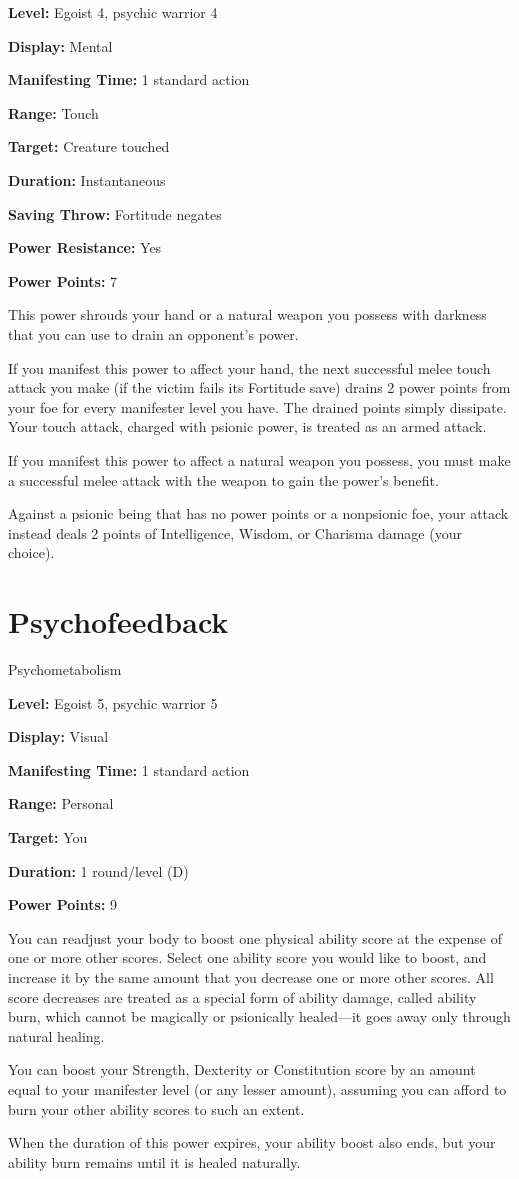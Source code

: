 \documentclass{article}
\begin{document}
\textbf{Level:} Egoist 4, psychic warrior 4

\textbf{Display:} Mental

\textbf{Manifesting Time:} 1 standard action

\textbf{Range:} Touch

\textbf{Target:} Creature touched

\textbf{Duration:} Instantaneous

\textbf{Saving Throw:} Fortitude negates

\textbf{Power Resistance:} Yes

\textbf{Power Points:} 7

This power shrouds your hand or a natural weapon you possess with darkness that 
you can use to drain an opponent's power.

If you manifest this power to affect your hand, the next successful melee touch 
attack you make (if the victim fails its Fortitude save) drains 2 power points 
from your foe for every manifester level you have. The drained points simply dissipate. 
Your touch attack, charged with psionic power, is treated as an armed attack.

If you manifest this power to affect a natural weapon you possess, you must make 
a successful melee attack with the weapon to gain the power's benefit.

Against a psionic being that has no power points or a nonpsionic foe, your attack 
instead deals 2 points of Intelligence, Wisdom, or Charisma damage (your choice).

\vspace{12pt}
\section*{Psychofeedback}

Psychometabolism

\textbf{Level:} Egoist 5, psychic warrior 5

\textbf{Display:} Visual

\textbf{Manifesting Time:} 1 standard action

\textbf{Range:} Personal

\textbf{Target:} You

\textbf{Duration:} 1 round/level (D)

\textbf{Power Points:} 9

You can readjust your body to boost one physical ability score at the expense of 
one or more other scores. Select one ability score you would like to boost, and 
increase it by the same amount that you decrease one or more other scores. All 
score decreases are treated as a special form of ability damage, called ability 
burn, which cannot be magically or psionically healed---it goes away only through 
natural healing.

You can boost your Strength, Dexterity or Constitution score by an amount equal 
to your manifester level (or any lesser amount), assuming you can afford to burn 
your other ability scores to such an extent.

When the duration of this power expires, your ability boost also ends, but your 
ability burn remains until it is healed naturally.

\newpage
\end{document}
